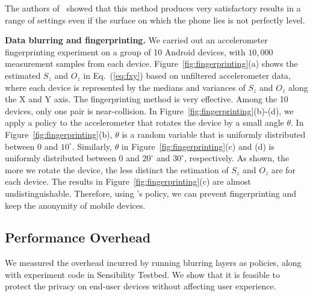 The authors of~\cite{bojinov2014mobile} showed that this method 
produces very satisfactory results in a range of settings even 
if the surface on which the phone lies is not perfectly level.

\textbf{Data blurring and fingerprinting.}
We carried out an accelerometer fingerprinting experiment on a group
of 10 Android devices, with $10,000$ measurement samples from each device.
Figure~\ref{fig:fingerprinting}(a) shows the estimated $S_z$ and $O_z$ in Eq.~(\ref{eq:fxy})
based on unfiltered accelerometer data, where each device is represented 
by the medians and variances of $S_z$ and $O_z$ along the X and Y axis. 
The fingerprinting method is
very effective. Among the 10 devices, only one pair is near-collision. In
Figure~\ref{fig:fingerprinting}(b)-(d), we apply a policy to the 
accelerometer that rotates the device by a small angle $\theta$. In 
Figure~\ref{fig:fingerprinting}(b), $\theta$ is a random variable that is
uniformly distributed between $0$ and $10^{\circ}$. Similarly, $\theta$
in Figure~\ref{fig:fingerprinting}(c) and (d) is uniformly distributed 
between $0$ and $20^{\circ}$ and $30^{\circ}$, respectively. As shown, the more we rotate the 
device, the less distinct the estimation of $S_z$ and $O_z$ are for each 
device. The results in Figure~\ref{fig:fingerprinting}(c) are almost 
undistinguishable. Therefore, using \sysname's policy, we can 
prevent fingerprinting and keep the anonymity of mobile devices.

%
%

\subsection{Performance Overhead}\label{sec-benchmark}

We measured the overhead incurred by running blurring layers as policies, 
along with experiment code in Sensibility Testbed. We show that it is 
feasible to protect the privacy on end-user devices without 
affecting user experience. 

